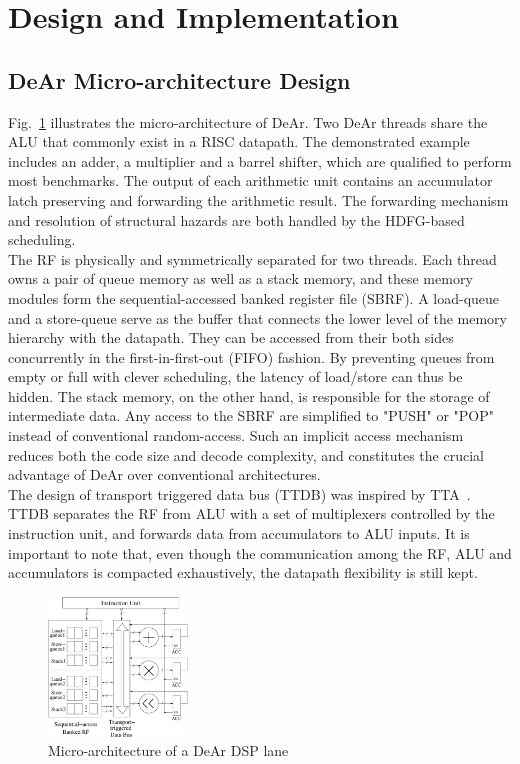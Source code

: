 \section{Design and Implementation}
\subsection{DeAr Micro-architecture Design}
Fig.~\ref{fig:micro} illustrates the micro-architecture of DeAr.
Two DeAr threads share the ALU that commonly exist in a RISC datapath.
The demonstrated example includes an adder, a multiplier and a barrel shifter, which are qualified to perform most benchmarks.
The output of each arithmetic unit contains an accumulator latch preserving and forwarding the arithmetic result.
The forwarding mechanism and resolution of structural hazards are both handled by the HDFG-based scheduling.
\\\indent
The RF is physically and symmetrically separated for two threads.
Each thread owns a pair of queue memory as well as a stack memory, 
and these memory modules form the sequential-accessed banked register file (SBRF).
A load-queue and a store-queue serve as the buffer that connects the lower level of the memory hierarchy with the datapath.
They can be accessed from their both sides concurrently in the first-in-first-out (FIFO) fashion.
By preventing queues from empty or full with clever scheduling, the latency of load/store can thus be hidden.
The stack memory, on the other hand, is responsible for the storage of intermediate data.
Any access to the SBRF are simplified to "PUSH" or "POP" instead of conventional random-access.
Such an implicit access mechanism reduces both the code size and decode complexity, 
and constitutes the crucial advantage of DeAr over conventional architectures.
\\\indent
The design of transport triggered data bus (TTDB) was inspired by TTA~\cite{tta}.
TTDB separates the RF from ALU with a set of multiplexers controlled by the instruction unit, 
and forwards data from accumulators to ALU inputs.
It is important to note that, even though the communication among the RF, ALU and accumulators is compacted exhaustively, 
the datapath flexibility is still kept.%
\begin{figure}[t]
    \centering
    \includegraphics[width=0.33\textwidth]{./figs/micro.eps}
    \caption{Micro-architecture of a DeAr DSP lane}
    \label{fig:micro}
\end{figure}
